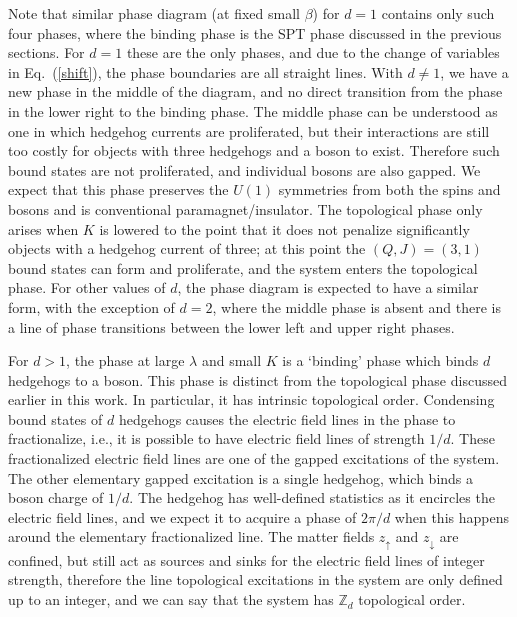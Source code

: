 \documentclass[prb,twocolumn]{revtex4-1}
\begin{document}
Note that similar phase diagram (at fixed small $\beta$) for $d=1$ contains only such four phases, where the binding phase is the SPT phase discussed in the previous sections. For $d=1$ these are the only phases, and due to the change of variables in Eq.~(\ref{shift}), the phase boundaries are all straight lines.
With $d\neq 1$, we have a new phase in the middle of the diagram, and no direct transition from the phase in the lower right to the binding phase. The middle phase can be understood as one in which hedgehog currents are proliferated, but their interactions are still too costly for objects with three hedgehogs and a boson to exist. Therefore such bound states are not proliferated, and individual bosons are also gapped.  We expect that this phase preserves the $U(1)$ symmetries from both the spins and bosons and is conventional paramagnet/insulator. The topological phase only arises when $K$ is lowered to the point that it does not penalize significantly objects with a hedgehog current of three; at this point the $(Q, J) = (3, 1)$ bound states can form and proliferate, and the system enters the topological phase. For other values of $d$, the phase diagram is expected to have a similar form, with the exception of $d=2$, where the middle phase is absent and there is a line of phase transitions between the lower left and upper right phases.

For $d>1$, the phase at large $\lambda$ and small $K$ is a `binding' phase which binds $d$ hedgehogs to a boson. This phase is distinct from the topological phase discussed earlier in this work. In particular, it has intrinsic topological order. Condensing bound states of $d$ hedgehogs causes the electric field lines in the phase to fractionalize, i.e., it is possible to have electric field lines of strength $1/d$. These fractionalized electric field lines are one of the gapped excitations of the system. The other elementary gapped excitation is a single hedgehog, which binds a boson charge of $1/d$. The hedgehog has well-defined statistics as it encircles the electric field lines, and we expect it to acquire a phase of $2\pi/d$ when this happens around the elementary fractionalized line. The matter fields $z_\uparrow$ and $z_\downarrow$ are confined, but still act as sources and sinks for the electric field lines of integer strength, therefore the line topological excitations in the system are only defined up to an integer, and we can say that the system has $\mathbb{Z}_d$ topological order.
\end{document}
